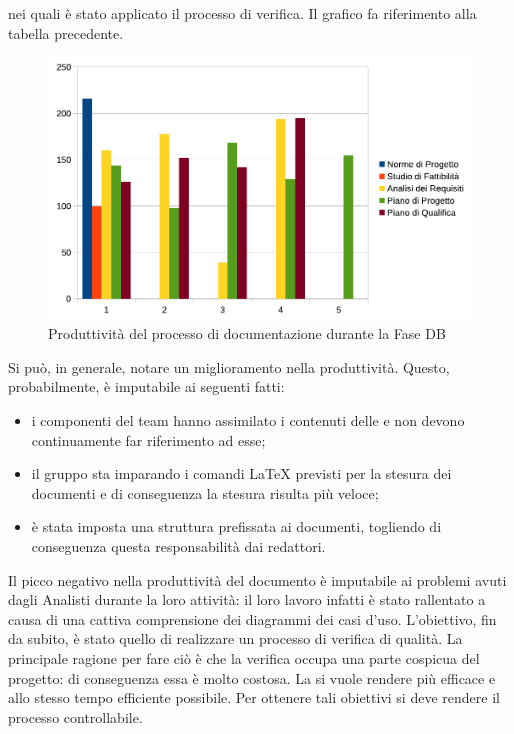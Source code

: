 				 nei quali è stato applicato il processo di verifica. Il grafico fa riferimento alla tabella precedente.
				\begin{figure}[H]
					\centering
					\includegraphics[width=12cm]{PianoDiQualifica/Pics/ProduttivitaDocumentazioneFaseDB.pdf}
					\caption{Produttività del processo di documentazione durante la Fase DB}
				\end{figure}
				Si può, in generale, notare un miglioramento nella produttività. Questo, probabilmente, è imputabile ai seguenti fatti:
				\begin{itemize}
					\item i componenti del team hanno assimilato i contenuti delle  e non devono continuamente far 
					riferimento ad esse;
					\item il gruppo sta imparando i comandi \LaTeX{} previsti per la stesura dei documenti e di conseguenza la stesura risulta più veloce;
					\item è stata imposta una struttura prefissata ai documenti, togliendo di conseguenza questa responsabilità dai redattori.
				\end{itemize}
				Il picco negativo nella produttività del documento  è imputabile ai problemi avuti dagli Analisti durante 
				la loro attività: il loro lavoro infatti è stato rallentato a causa di una cattiva comprensione dei diagrammi dei casi d'uso.
				L'obiettivo, fin da subito, è stato quello di realizzare un processo di verifica di qualità. La principale ragione per fare ciò è che la 
				verifica occupa una parte cospicua del progetto: di conseguenza essa è molto costosa. La si vuole rendere più efficace e allo stesso 
				tempo efficiente possibile. Per ottenere tali obiettivi si deve rendere il processo controllabile.\\
